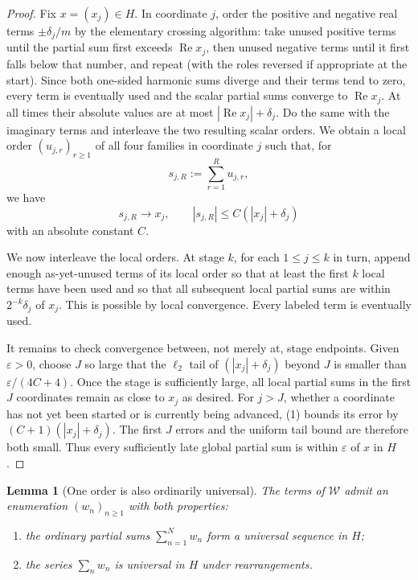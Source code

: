 \documentclass[11pt]{article}
\newtheorem{lemma}[theorem]{Lemma}
\newcommand{\cW}{\mathcal W}
\begin{document}
\begin{proof}
Fix $x=(x_j)\in H$.  In coordinate $j$, order the positive and negative
real terms $\pm\delta_j/m$ by the elementary crossing algorithm: take unused
positive terms until the partial sum first exceeds $\operatorname{Re}x_j$,
then unused negative terms until it first falls below that number, and repeat
(with the roles reversed if appropriate at the start).  Since both one-sided
harmonic sums diverge and their terms tend to zero, every term is eventually
used and the scalar partial sums converge to $\operatorname{Re}x_j$.  At all
times their absolute values are at most
$|\operatorname{Re}x_j|+\delta_j$.  Do the same with the imaginary terms and
interleave the two resulting scalar orders.  We obtain a local order
$(u_{j,r})_{r\geq1}$ of all four families in coordinate $j$ such that, for
\[
  s_{j,R}:=\sum_{r=1}^R u_{j,r},
\]
we have
\[
  s_{j,R}\longrightarrow x_j,
  \qquad
  |s_{j,R}|\leq C(|x_j|+\delta_j)                         \tag{1}
\]
with an absolute constant $C$.

We now interleave the local orders.  At stage $k$, for each $1\leq j\leq k$
in turn, append enough as-yet-unused terms of its local order so that at least
the first $k$ local terms have been used and so that all subsequent local
partial sums are within $2^{-k}\delta_j$ of $x_j$.  This is possible by local
convergence.  Every labeled term is eventually used.

It remains to check convergence between, not merely at, stage endpoints.
Given $\varepsilon>0$, choose $J$ so large that the $\ell_2$ tail of
$(|x_j|+\delta_j)$ beyond $J$ is smaller than
$\varepsilon/(4C+4)$.  Once the stage is sufficiently large, all local
partial sums in the first $J$ coordinates remain as close to $x_j$ as desired.
For $j>J$, whether a coordinate has not yet been started or is currently being
advanced, (1) bounds its error by
$(C+1)(|x_j|+\delta_j)$.  The first $J$ errors and the uniform tail bound are
therefore both small.  Thus every sufficiently late global partial sum is
within $\varepsilon$ of $x$ in $H$.
\end{proof}

\begin{lemma}[One order is also ordinarily universal]\label{lem:order}
The terms of $\cW$ admit an enumeration $(w_n)_{n\geq1}$ with both properties:
\begin{enumerate}
  \item the ordinary partial sums $\sum_{n=1}^Nw_n$ form a universal sequence
        in $H$;
  \item the series $\sum_nw_n$ is universal in $H$ under rearrangements.
\end{enumerate}
\end{lemma}
\end{document}
